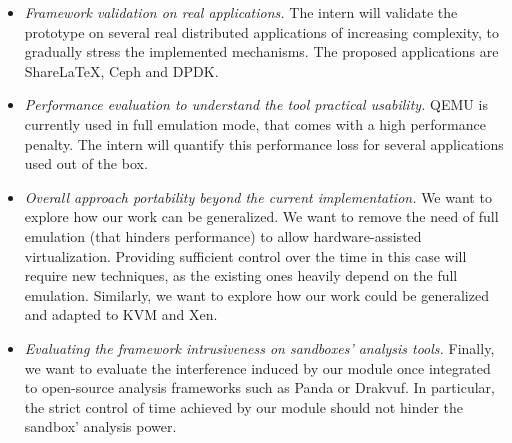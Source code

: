 \documentclass[a4paper,11pt]{article}
\begin{document}
\begin{itemize}
\item \textit{Framework validation on real applications.} The intern will validate the prototype on
  several real distributed applications of increasing complexity, to gradually stress the
  implemented mechanisms. The proposed applications are ShareLaTeX, Ceph and DPDK.
\vspace{-.5\baselineskip} %
\item \textit{Performance evaluation to understand the tool practical usability.} QEMU is currently
  used in full emulation mode, that comes with a high performance penalty. The intern will quantify
  this performance loss for several applications used out of the box. \vspace{-.5\baselineskip} %
\item \textit{Overall approach portability beyond the current implementation.} We want to explore
  how our work can be generalized. We want to remove the need of full emulation (that hinders
  performance) to allow hardware-assisted virtualization. Providing sufficient control over the time in
  this case will require new techniques, as the existing ones heavily depend on the full emulation.
  Similarly, we want to explore how our work could be generalized and adapted to KVM and Xen.
\vspace{-.5\baselineskip} %
\item \textit{Evaluating the framework intrusiveness on sandboxes' analysis tools.} Finally, we want
  to evaluate the interference induced by our module once integrated to open-source analysis
  frameworks such as Panda or Drakvuf. In particular, the strict control of time achieved by our
  module should not hinder the sandbox' analysis power.
\end{itemize}
\end{document}
